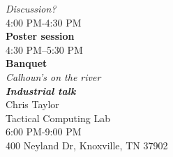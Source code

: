\begin{calendar}{\textwidth}
{\textit{Discussion?}  \\\vspace{0.1cm}4:00 PM-4:30 PM \\\daysep
\textbf{Poster session} \\\vspace{0.1cm} 4:30 PM--5:30 PM \\\daysep
\textbf{Banquet} \\
\textit{Calhoun's on the river}\\\vspace{0.1cm} \textbf{\textit{Industrial talk}} \\ Chris Taylor \\Tactical Computing Lab \\\vspace{0.1cm}  6:00 PM-9:00 PM \\ 400 Neyland Dr, Knoxville, TN 37902\\\daysep
}




\end{calendar}

